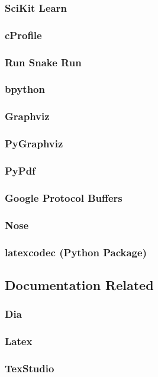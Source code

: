 \documentclass[a4paper,11pt]{report}
\begin{document}
\subsubsection*{SciKit Learn}
\subsubsection*{cProfile}
\subsubsection*{Run Snake Run}
\subsubsection*{bpython}
\subsubsection*{Graphviz}
\subsubsection*{PyGraphviz}
\subsubsection*{PyPdf}
\subsubsection*{Google Protocol Buffers}
\subsubsection*{Nose}
\subsubsection*{latexcodec (Python Package)}

\subsection{Documentation Related}
\subsubsection*{Dia}
\subsubsection*{Latex}
\subsubsection*{TexStudio}
\end{document}
